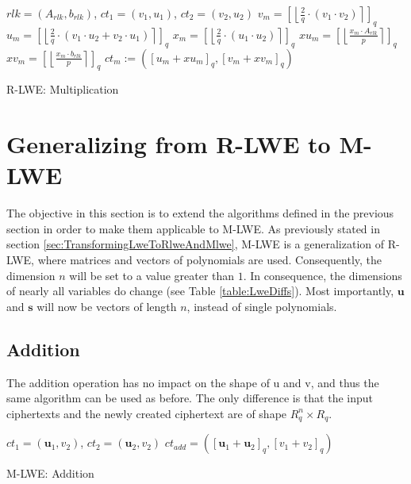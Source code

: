 \begin{algorithm}[htb]
  \begin{algorithmic}[1]
    \REQUIRE $rlk=(A_{rlk}, b_{rlk})$, $ct_1 = (v_1, u_1)$, $ct_2 = (v_2, u_2)$
    \STATE $v_m = \left[\left\lfloor \frac{2}{q}\cdot (v_1 \cdot v_2)\right\rceil\right] _q $
    \STATE $u_m = \left[\left\lfloor \frac{2}{q}\cdot(v_1 \cdot u_2 + v_2 \cdot u_1)\right\rceil\right] _q$
    \STATE $x_m = \left[\left\lfloor \frac{2}{q}\cdot(u_1 \cdot u_2)\right\rceil\right] _q$
    \STATE $xu_m = \left[\left\lfloor \frac{x_m \cdot A_{rlk}}{p}  \right\rceil \right]_q$
    \STATE $xv_m = \left[\left\lfloor \frac{x_m \cdot b_{rlk}}{p}  \right\rceil \right]_q$
    \RETURN $ct_m:=(\left[u_m + xu_m\right]_q , \left[v_m + xv_m\right]_q )$
  \end{algorithmic}
  \caption{R-LWE: Multiplication}
  \label{alg:RingMultiplication}
\end{algorithm}

\section{Generalizing from R-LWE to M-LWE}
\label{sec:GeneralizingToMLWE}

The objective in this section is to extend the algorithms defined in the previous section in order to make them applicable to M-LWE. As previously stated in section \ref{sec:TransformingLweToRlweAndMlwe}, M-LWE is a generalization of R-LWE, where matrices and vectors of polynomials are used. Consequently, the dimension $n$ will be set to a value greater than $1$. In consequence, the dimensions of nearly all variables do change (see Table \ref{table:LweDiffs}). Most importantly, $\textbf{u}$ and $\textbf{s}$ will now be vectors of length $n$, instead of single polynomials.

\subsection*{Addition}

The addition operation has no impact on the shape of u and v, and thus the same algorithm can be used as before. The only difference is that the input ciphertexts and the newly created ciphertext are of shape $R_q^{n}\times R_q$.

\begin{algorithm}[htb]
  \begin{algorithmic}[1]
    \REQUIRE $ct_1 = (\textbf{u}_1, v_2)$, $ct_2 = (\textbf{u}_2, v_2)$
    \RETURN $ct_{add} = ([\textbf{u}_1 + \textbf{u}_2]_q, [v_1 + v_2]_q)$
  \end{algorithmic}
  \caption{M-LWE: Addition}
  \label{alg:MlweAddition}
\end{algorithm}

